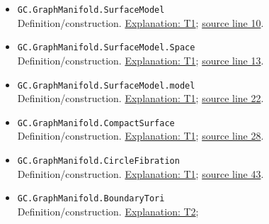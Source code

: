 \documentclass[
  letterpaper,
  11pt]{article}
\begin{document}
\begin{itemize}
\item
  {\small\texttt{GC.\allowbreak{}Graph\allowbreak{}Manifold.\allowbreak{}Surface\allowbreak{}Model}}\\
  Definition/construction. \hyperref[t1]{Explanation: T1};
  \href{https://github.com/qinz1yang/differential-geometry-dev/blob/ea0fae60ee01ef8c8d9b57a51794c6538f679c5d/DifferentialGeometry/Topology/ThreeManifold/GraphManifold/Presentation.lean\#L10}{source
  line 10}.
\item
  {\small\texttt{GC.\allowbreak{}Graph\allowbreak{}Manifold.\allowbreak{}Surface\allowbreak{}Model.\allowbreak{}Space}}\\
  Definition/construction. \hyperref[t1]{Explanation: T1};
  \href{https://github.com/qinz1yang/differential-geometry-dev/blob/ea0fae60ee01ef8c8d9b57a51794c6538f679c5d/DifferentialGeometry/Topology/ThreeManifold/GraphManifold/Presentation.lean\#L13}{source
  line 13}.
\item
  {\small\texttt{GC.\allowbreak{}Graph\allowbreak{}Manifold.\allowbreak{}Surface\allowbreak{}Model.\allowbreak{}model}}\\
  Definition/construction. \hyperref[t1]{Explanation: T1};
  \href{https://github.com/qinz1yang/differential-geometry-dev/blob/ea0fae60ee01ef8c8d9b57a51794c6538f679c5d/DifferentialGeometry/Topology/ThreeManifold/GraphManifold/Presentation.lean\#L22}{source
  line 22}.
\item
  {\small\texttt{GC.\allowbreak{}Graph\allowbreak{}Manifold.\allowbreak{}Compact\allowbreak{}Surface}}\\
  Definition/construction. \hyperref[t1]{Explanation: T1};
  \href{https://github.com/qinz1yang/differential-geometry-dev/blob/ea0fae60ee01ef8c8d9b57a51794c6538f679c5d/DifferentialGeometry/Topology/ThreeManifold/GraphManifold/Presentation.lean\#L28}{source
  line 28}.
\item
  {\small\texttt{GC.\allowbreak{}Graph\allowbreak{}Manifold.\allowbreak{}Circle\allowbreak{}Fibration}}\\
  Definition/construction. \hyperref[t1]{Explanation: T1};
  \href{https://github.com/qinz1yang/differential-geometry-dev/blob/ea0fae60ee01ef8c8d9b57a51794c6538f679c5d/DifferentialGeometry/Topology/ThreeManifold/GraphManifold/Presentation.lean\#L43}{source
  line 43}.
\item
  {\small\texttt{GC.\allowbreak{}Graph\allowbreak{}Manifold.\allowbreak{}Boundary\allowbreak{}Tori}}\\
  Definition/construction. \hyperref[t2]{Explanation: T2};

\end{itemize}
\end{document}
